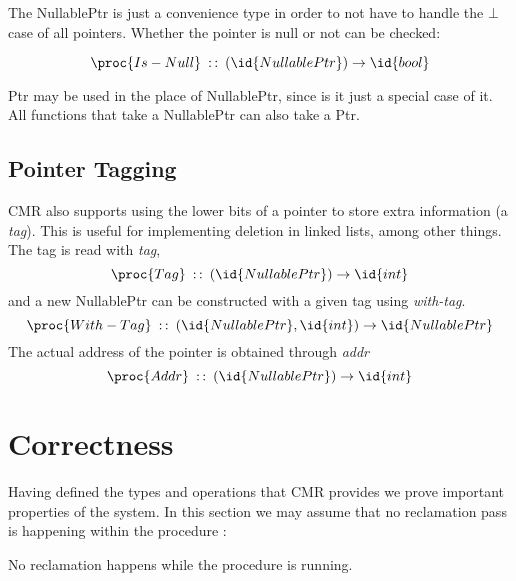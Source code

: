 The NullablePtr is just a convenience type in order to not have to handle the $\bot$ case of all
pointers. Whether the pointer is null or not can be checked:

\begin{equation}\label{eq:nullable-is-null}
  \proc{Is-Null}\typeof (\id{NullablePtr}) \to \id{bool}
\end{equation}

Ptr may be used in the place of NullablePtr, since is it just a special case of it. All functions
that take a NullablePtr can also take a Ptr.



\subsection{Pointer Tagging\label{sec:cmr-pointer-tagging}}

CMR also supports using the lower bits of a pointer to store extra information (a \emph{tag}). This
is useful for implementing deletion in linked lists, among other things. The tag is read with
\emph{tag},
\begin{equation}\label{eq:ptr-tag}
  \proc{Tag}\typeof{} (\id{NullablePtr}) \to \id{int}
\end{equation}
and a new NullablePtr can be constructed with a given tag using \emph{with-tag}.
\begin{equation}\label{eq:ptr-with-tag}
  \proc{With-Tag}\typeof{} (\id{NullablePtr}, \id{int}) \to \id{NullablePtr}
\end{equation}
The actual address of the pointer is obtained through \emph{addr}
\begin{equation}\label{eq:ptr-addr}
  \proc{Addr}\typeof{} (\id{NullablePtr}) \to \id{int}
\end{equation}



\section{Correctness\label{sec:cmr-correctness}}

Having defined the types and operations that CMR provides we prove important properties of the
system. In this section we may assume that no reclamation pass is happening within the procedure
:

\begin{claim}
  \label{def:load-atomic-no-reclamation}
  No reclamation happens while the procedure  is running.
\end{claim}

